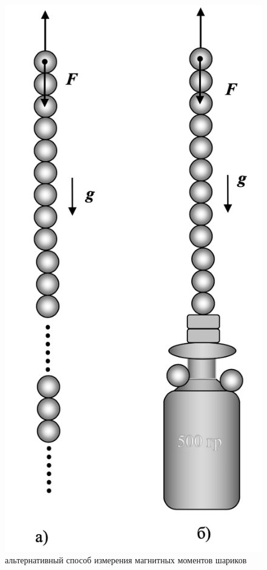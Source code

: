 \documentclass[a4paper,12pt]{article}
\begin{document}
\begin{enumerate}
\begin{figure}[h!]
\includegraphics[scale=0.25]{ris2.png}
\caption{альтернативный способ измерения магнитных моментов шариков} 
\end{figure}
\end{enumerate}
\end{document}
